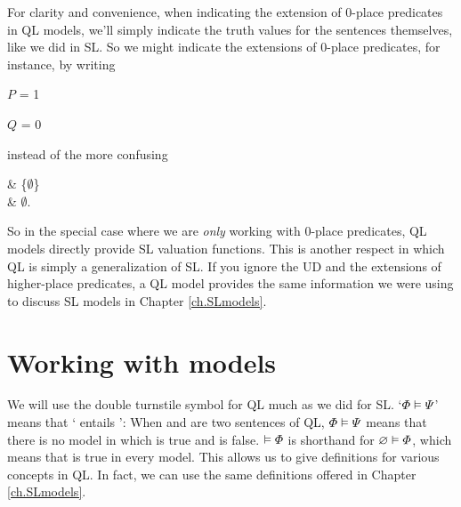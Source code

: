 For clarity and convenience, when indicating the extension of 0-place predicates in QL models, we'll simply indicate the truth values for the sentences themselves, like we did in SL. So we might indicate the extensions of 0-place predicates, for instance, by writing

\begin{ekey}
\item{$P$} = 1
\item{$Q$} = 0
\end{ekey}

instead of the more confusing

\begin{partialmodel}
	 & \{$\emptyset$\}\\
	 & $\emptyset$. \\
\end{partialmodel}

So in the special case where we are \emph{only} working with 0-place predicates, QL models directly provide SL valuation functions. This is another respect in which QL is simply a generalization of SL. If you ignore the UD and the extensions of higher-place predicates, a QL model provides the same information we were using to discuss SL models in Chapter \ref{ch.SLmodels}.

\section{Working with models}
\label{sec.UsingModels}


We will use the double turnstile symbol for QL much as we did for SL. `$\varPhi{}\vDash\varPsi{}$' means that `\metaA{} entails \metaB{}': When \metaA{} and \metaB{} are two sentences of QL, $\varPhi{}\vDash\varPsi{}$ means that there is no model in which \metaA{} is true and \metaB{} is false. $\vDash\varPhi{}$ is shorthand for $\varnothing\vDash\varPhi{}$, which means that \metaA{} is true in every model. This allows us to give definitions for various concepts in QL. In fact, we can use the same definitions offered in Chapter \ref{ch.SLmodels}.

